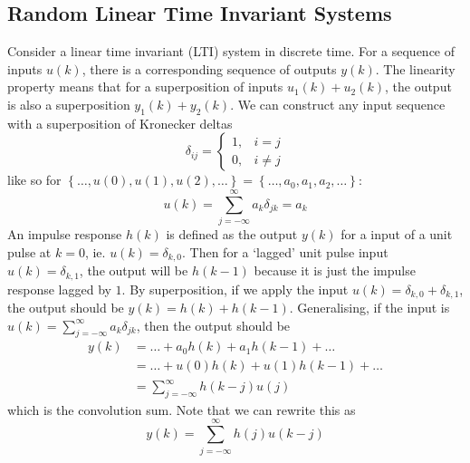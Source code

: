 \documentclass[11pt]{report} %
\begin{document}
\subsection{Random Linear Time Invariant Systems}

Consider a linear time invariant (LTI) system in discrete time. For a sequence of inputs $u\left(k\right)$, there is a corresponding sequence of outputs $y\left(k\right)$. The linearity property means that for a superposition of inputs $u_{1}\left(k\right) + u_{2}\left(k\right)$, the output is also a superposition $y_{1}\left(k\right) + y_{2}\left(k\right)$. We can construct any input sequence with a superposition of Kronecker deltas
\begin{equation}
\delta_{ij} = \begin{cases} 1, & i = j \\ 0, & i\neq j\end{cases}
\end{equation}
like so for $\left\{\dots, u\left(0\right), u\left(1\right), u\left(2\right), \dots\right\} =  \left\{\dots, a_{0}, a_{1}, a_{2}, \dots\right\}$:
\begin{equation}
u\left(k\right) = \sum_{j = -\infty}^{\infty}a_{k}\delta_{jk} = a_{k}
\end{equation}
An impulse response $h\left(k\right)$ is defined as the output $y\left(k\right)$ for a input of a unit pulse at $k = 0$, ie. $u\left(k\right) = \delta_{k,0}$. Then for a `lagged' unit pulse input $u\left(k\right) = \delta_{k,1}$, the output will be $h\left(k - 1\right)$ because it is just the  impulse response lagged by $1$. By superposition, if we apply the input $u\left(k\right) = \delta_{k,0} + \delta_{k,1}$, the output should be $y\left(k\right) = h\left(k\right) + h\left(k - 1\right)$. Generalising, if the input is $u\left(k\right) = \sum_{j = -\infty}^{\infty}a_{k}\delta_{jk}$, then the output should be
\begin{align}
y\left(k\right) &= \dots + a_{0}h\left(k\right) + a_{1}h\left(k - 1\right) + \dots \\
&= \dots + u\left(0\right)h\left(k\right) + u\left(1\right)h\left(k - 1\right) + \dots \\
&= \sum_{j = -\infty}^{\infty}h\left(k - j\right)u\left(j\right)
\end{align}
which is the convolution sum. Note that we can rewrite this as
\begin{equation}
y\left(k\right) = \sum_{j = -\infty}^{\infty}h\left(j\right)u\left(k - j\right)
\end{equation}
\end{document}
